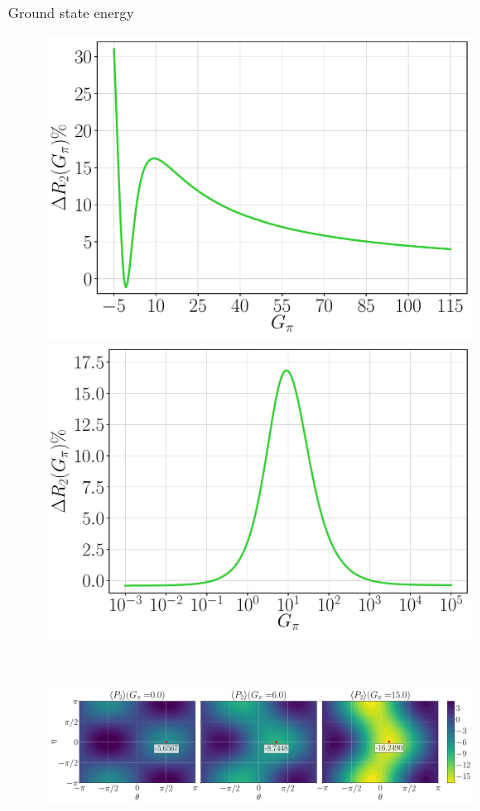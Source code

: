 \documentclass[9pt, aspectratio=169]{beamer}
\begin{document}
\begin{frame}[allowframebreaks]{Ground state energy}
	\begin{figure}[!p]
		\centering
		\begin{minipage}[c]{.4\linewidth}
			\centering
			\includegraphics[width=.8\linewidth]{Figures/NJL1-model-solving/G2-err}
		\end{minipage}
		\hspace{.025\linewidth}
		\begin{minipage}[c]{.4\linewidth}
			\centering
			\includegraphics[width=.8\linewidth]{Figures/NJL1-model-solving/G2-logerr}
		\end{minipage} \\[-1em]
		\begin{center}
			\includegraphics[width=.7\paperwidth]{Figures/NJL1-model-solving/P2-tri-contour}
		\end{center}
	\end{figure}
	\vspace{-2em}

\end{frame}
\end{document}
